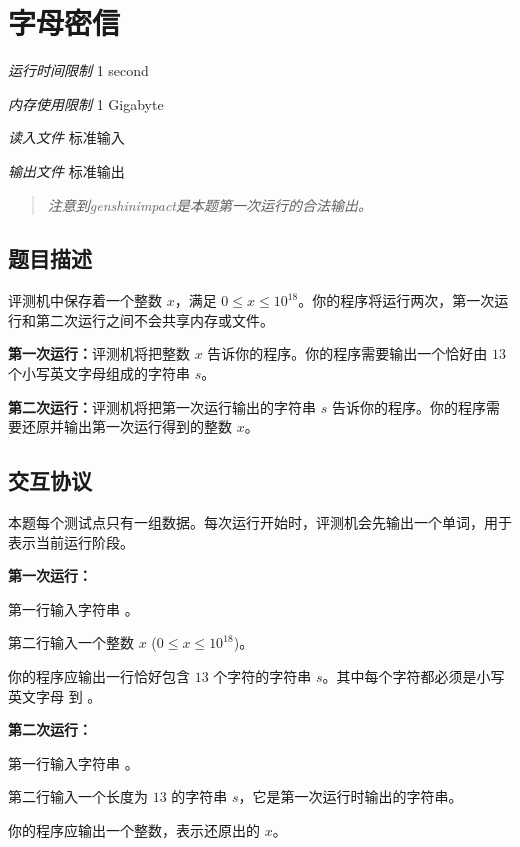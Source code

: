 \section[C. 字母密信]{ 字母密信}

\textit{运行时间限制}   1 second

\textit{内存使用限制} 1 Gigabyte

\textit{读入文件} \qquad 标准输入

\textit{输出文件} \qquad 标准输出

\begin{quote}
   \textit{注意到genshinimpact是本题第一次运行的合法输出。}
\end{quote}


\subsection{题目描述}

评测机中保存着一个整数 $x$，满足 $0 \le x \le 10^{18}$。你的程序将运行两次，第一次运行和第二次运行之间不会共享内存或文件。

\textbf{第一次运行：}评测机将把整数 $x$ 告诉你的程序。你的程序需要输出一个恰好由 $13$ 个小写英文字母组成的字符串 $s$。

\textbf{第二次运行：}评测机将把第一次运行输出的字符串 $s$ 告诉你的程序。你的程序需要还原并输出第一次运行得到的整数 $x$。

\subsection{交互协议}

本题每个测试点只有一组数据。每次运行开始时，评测机会先输出一个单词，用于表示当前运行阶段。

\textbf{第一次运行：}

第一行输入字符串 。

第二行输入一个整数 $x$ ($0 \le x \le 10^{18}$)。

你的程序应输出一行恰好包含 $13$ 个字符的字符串 $s$。其中每个字符都必须是小写英文字母  到 。

\textbf{第二次运行：}

第一行输入字符串 。

第二行输入一个长度为 $13$ 的字符串 $s$，它是第一次运行时输出的字符串。

你的程序应输出一个整数，表示还原出的 $x$。

